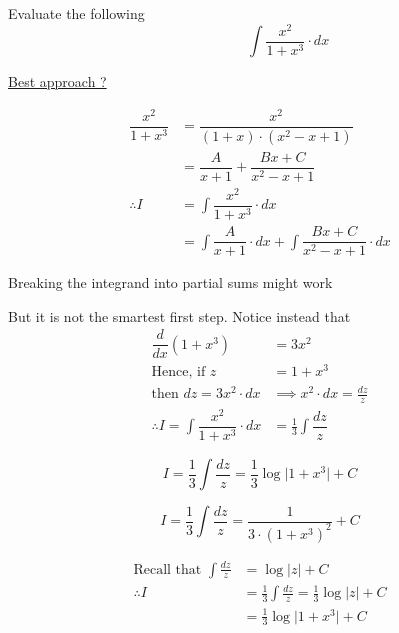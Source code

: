 \documentclass[14pt,fleqn]{extarticle}
\begin{document}
Evaluate the following \[ \qquad\qquad\int\frac{x^2}{1+x^3}\cdot dx \]

\newcard 

\underline{Best approach ?}

\begin{align}
\dfrac{x^2}{1+x^3} &= \dfrac{x^2}{(1+x)\cdot (x^2-x+1)} \\ 
&= \dfrac{A}{x+1} + \dfrac{Bx + C}{x^2-x+1} \\
\therefore I &= \int\dfrac{x^2}{1+x^3}\cdot dx \\
&= \int\dfrac{A}{x+1}\cdot dx + \int\dfrac{Bx+ C}{x^2 - x + 1}\cdot dx 
\end{align}

\newcard 

Breaking the integrand into partial
sums might work\newline

But it is not the smartest first step. Notice instead that 
\begin{align}
\dfrac{d}{dx} \left(1+x^3\right) &= 3x^2 \\
\text{Hence, if } z &= 1+x^3 \\
\text{then }dz = 3x^2\cdot dx &\implies x^2\cdot dx = \frac{dz}{z} \\
\therefore I = \int\dfrac{x^2}{1+x^3}\cdot dx &= \frac{1}{3}\int\dfrac{dz}{z}
\end{align}

\newcard

\[ I = \frac{1}{3}\int\dfrac{dz}{z} = \frac{1}{3}\log\vert1+x^3\vert + C \]

\newcard

\[ I = \frac{1}{3}\int\dfrac{dz}{z} = \frac{1}{3\cdot (1+x^3)^2} + C \]

\newcard 

\begin{align}
\text{Recall that } \int\frac{dz}{z} &= \log\vert z\vert + C \\
\therefore I &= \frac{1}{3}\int\frac{dz}{z} = \frac{1}{3}\log\vert z\vert + C \\
&= \frac{1}{3}\log\vert1+x^3\vert + C
\end{align}
\end{document}
